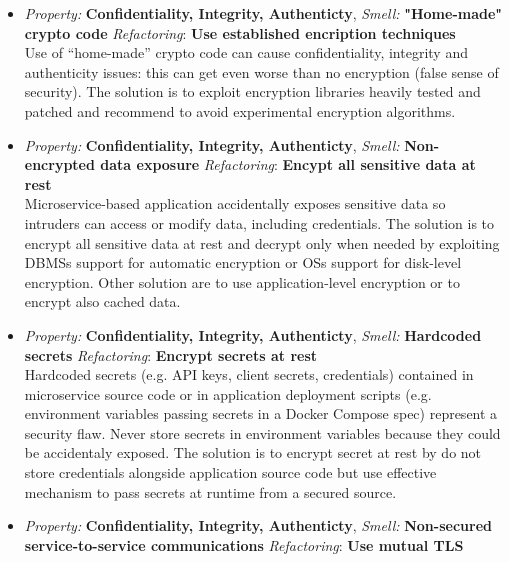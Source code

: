 \documentclass[10pt,a4paper]{report}
\begin{document}
\begin{itemize}
	 \item \textit{Property: } \textbf{Confidentiality, Integrity, Authenticty}, \textit{Smell:} \textbf{"Home-made" crypto code} \textit{Refactoring}: \textbf{Use established encription techniques} \\
	 
	 Use of “home-made” crypto code can cause confidentiality, integrity and authenticity issues: this can get even worse than no encryption (false sense of security). The solution is to exploit encryption libraries heavily tested and patched and recommend to avoid experimental encryption algorithms.
	 
	 
	  \item \textit{Property: } \textbf{Confidentiality, Integrity, Authenticty}, \textit{Smell:} \textbf{Non-encrypted data exposure} \textit{Refactoring}: \textbf{Encypt all sensitive data at rest} \\
	 
	 Microservice-based application accidentally exposes sensitive data so intruders can access or modify data, including credentials. The solution is to encrypt all sensitive data at rest and decrypt only when needed by exploiting DBMSs support for automatic encryption or OSs support for disk-level encryption. Other solution are to use application-level encryption or to encrypt also cached data. 
	 
	 \item \textit{Property: } \textbf{Confidentiality, Integrity, Authenticty}, \textit{Smell:} \textbf{Hardcoded secrets} \textit{Refactoring}: \textbf{Encrypt secrets at rest} \\
	 
	 Hardcoded secrets (e.g. API keys, client secrets, credentials) contained in microservice source code or in application deployment scripts (e.g. environment variables passing secrets in a Docker Compose spec) represent a security flaw. 	 Never store secrets in environment variables because they could be accidentaly exposed. The solution is to encrypt secret at rest by do not store credentials alongside application source code but use effective mechanism to pass secrets at runtime from a secured source.
	 
	 
	 \item \textit{Property: } \textbf{Confidentiality, Integrity, Authenticty}, \textit{Smell:} \textbf{Non-secured service-to-service 	communications} \textit{Refactoring}: \textbf{Use mutual TLS} \\
	 

\end{itemize}
\end{document}
